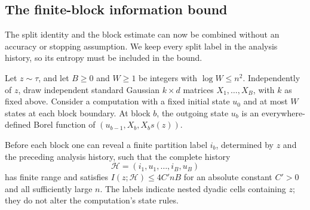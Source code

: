 \subsection{The finite-block information bound}

The split identity and the block estimate can now be combined without
an accuracy or stopping assumption.  We keep every split label in the
analysis history, so its entropy must be included in the bound.

\begin{proposition}
\label{l:bounded-split:iteration}
Let \(z\sim\tau\), and let \(B\ge0\) and \(W\ge1\) be integers
with \(\log W\le n^2\).  Independently of \(z\), draw independent
standard Gaussian \(k\times d\) matrices
\(X_1,\ldots,X_B\), with \(k\) as fixed above.  Consider a
computation with a fixed initial state \(u_0\) and at most \(W\) states
at each block boundary.  At block \(b\),
the outgoing state \(u_b\) is an everywhere-defined Borel function of
\((u_{b-1},X_b,X_bs(z))\).

Before each block one can reveal a finite partition label \(i_b\),
determined by \(z\) and the preceding analysis history, such that the
complete history
\[
 \mathcal H=(i_1,u_1,\ldots,i_B,u_B)
\]
has finite range and satisfies
\(I(z;\mathcal H)\le4C'nB\) for an absolute constant \(C'>0\)
and all sufficiently large \(n\).  The labels indicate nested dyadic
cells containing \(z\); they do not alter the computation's state rules.
\end{proposition}


